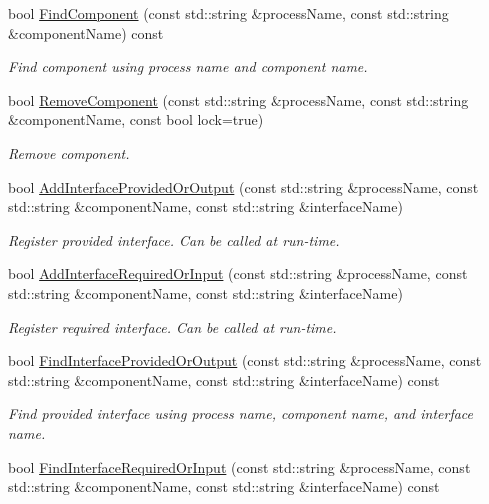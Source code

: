 \begin{DoxyCompactItemize}
bool \hyperlink{classmts_manager_global_a9381aad00498adae5fdf9488b6a749bc}{Find\+Component} (const std\+::string \&process\+Name, const std\+::string \&component\+Name) const 
\begin{DoxyCompactList}\small\item\em Find component using process name and component name. \end{DoxyCompactList}\item 
bool \hyperlink{classmts_manager_global_ad54d697f17391d0bd203ec66f33ef47c}{Remove\+Component} (const std\+::string \&process\+Name, const std\+::string \&component\+Name, const bool lock=true)
\begin{DoxyCompactList}\small\item\em Remove component. \end{DoxyCompactList}\item 
bool \hyperlink{classmts_manager_global_a78430c06228bba8577979f6bec9b8301}{Add\+Interface\+Provided\+Or\+Output} (const std\+::string \&process\+Name, const std\+::string \&component\+Name, const std\+::string \&interface\+Name)
\begin{DoxyCompactList}\small\item\em Register provided interface. Can be called at run-\/time. \end{DoxyCompactList}\item 
bool \hyperlink{classmts_manager_global_a26ed00e3c915e50262f13fb21ec4e621}{Add\+Interface\+Required\+Or\+Input} (const std\+::string \&process\+Name, const std\+::string \&component\+Name, const std\+::string \&interface\+Name)
\begin{DoxyCompactList}\small\item\em Register required interface. Can be called at run-\/time. \end{DoxyCompactList}\item 
bool \hyperlink{classmts_manager_global_a117115d1bdee6acb13a307eb88e48e46}{Find\+Interface\+Provided\+Or\+Output} (const std\+::string \&process\+Name, const std\+::string \&component\+Name, const std\+::string \&interface\+Name) const 
\begin{DoxyCompactList}\small\item\em Find provided interface using process name, component name, and interface name. \end{DoxyCompactList}\item 
bool \hyperlink{classmts_manager_global_a801480ff0373d7637abc45ce194c3be8}{Find\+Interface\+Required\+Or\+Input} (const std\+::string \&process\+Name, const std\+::string \&component\+Name, const std\+::string \&interface\+Name) const 

\end{DoxyCompactItemize}
